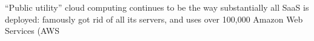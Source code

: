 “Public utility” cloud computing continues to be the way substantially all SaaS is deployed:  famously got rid of all its servers, and uses over 100,000 Amazon Web Services (AWS